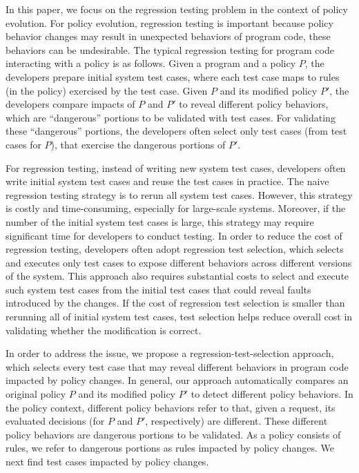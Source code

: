 In this paper, we focus on the regression testing problem in the context of policy evolution.
For policy evolution, regression testing is important because policy behavior changes may
result in unexpected behaviors of program code, these behaviors can be undesirable.
The typical regression testing for program code interacting with a policy is as follows.
Given a program and a policy $P$, the developers prepare initial system test cases, where
each test case maps to rules (in the policy) exercised by the test case. Given $P$ and its modified
policy $P'$, the developers compare impacts of $P$ and $P'$ to
reveal different policy behaviors, which are ``dangerous'' portions to be validated with
test cases. For validating these ``dangerous'' portions, the developers often select only test cases (from test cases for $P$), that exercise the dangerous
portions of $P'$.


For regression testing, instead of writing new system test cases, developers often write initial system test cases and 
reuse the test cases in practice. The naive regression testing strategy is to rerun all system test cases. However,
 this strategy is costly and time-consuming, especially for large-scale systems. Moreover, if the number of the initial 
system test cases is large, this strategy may require significant time for developers to conduct testing. In order to
 reduce the cost of regression testing, developers often adopt regression test selection, which selects and executes only
 test cases to expose different behaviors across different versions of the system. This approach also requires substantial
 costs to select and execute such system test cases from the initial test cases that could reveal faults introduced by the changes. 
If the cost of regression test selection is smaller than rerunning all of initial system test cases, test selection helps reduce 
overall cost in validating whether the modification is correct. 

In order to address the issue, we propose a regression-test-selection approach, which selects every test case that may 
reveal different behaviors in program code impacted by policy changes.
In general, our approach automatically compares an original 
policy $P$ and its modified policy $P'$ to detect different policy behaviors. In the policy context, different policy 
behaviors refer to that, given a request, its evaluated decisions (for $P$ and $P'$, respectively) are different.
These different policy behaviors are dangerous portions to be validated. As a policy consists of rules, we refer to dangerous portions as rules impacted by policy changes. 
We next find test cases impacted by policy changes.



